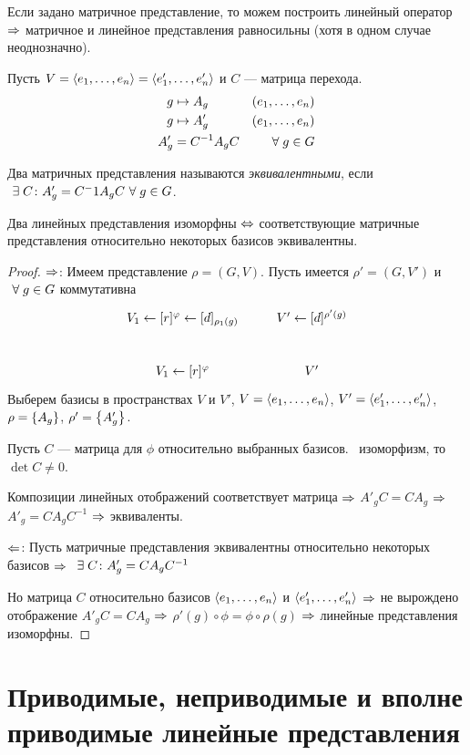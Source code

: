 Если задано матричное представление,
то можем построить линейный оператор $\Rightarrow$
матричное и линейное представления равносильны
(хотя в одном случае неоднозначно).

Пусть $V = \left\langle e_1 ,\ldots, e_n\right\rangle = \left\langle e'_1 ,\ldots, e'_n\right\rangle$ и $C$ --- матрица перехода.
\begin{align*}
	g &\mapsto A_g & \left(e_1 ,\ldots, e_n\right) \\
	g &\mapsto A'_g & \left(e_1 ,\ldots, e_n\right) \\
	A'_g & = C^{-1} A_g C & ~\forall\; g \in G
\end{align*}

\begin{df}
	Два матричных представления называются \textit{эквивалентными},
	если 
		$~\exists\; C \colon A'_g = C^-1 A_g C ~\forall\; g \in G$.
\end{df}

\begin{stm}
	Два линейных представления изоморфны $\Leftrightarrow$
	соответствующие матричные представления относительно некоторых базисов эквивалентны.
\end{stm}
\begin{proof}
	$\Rightarrow$: Имеем представление $\rho = (G, V)$.
	Пусть имеется $\rho' = (G, V')$ и $~\forall\; g \in G$ коммутативна
	$$
		\xymatrix{
				V_1 \ar[r]^{\phi} \ar[d]_{\rho_1(g)} & V' \ar[d]^{\rho'(g)} \\
				V_1 \ar[r]^{\phi} & V'
			}
	$$
	Выберем базисы в пространствах $V$ и $V'$,
	$V = \left\langle e_1 ,\ldots, e_n\right\rangle$, $V' = \left\langle e'_1 ,\ldots, e'_n\right\rangle$, $\rho = \left\{A_g\right\}$, $\rho' = \left\{A'_g\right\}$.

	Пусть $C$ --- матрица для $\phi$ относительно выбранных базисов.
	\Bt\ изоморфизм, то $\det C \ne 0$.

	Композиции линейных отображений соответствует матрица $\Rightarrow$
	$A'_g C = C A_g$ $\Rightarrow$ $A'_g = C A_g C^{-1}$ $\Rightarrow$ эквиваленты.

	$\Leftarrow$: Пусть матричные представления эквивалентны относительно некоторых базисов $\Rightarrow$
	$~\exists\; C \colon A'_g = C A_g C^{-1}$

	Но матрица $C$ относительно базисов $\left\langle e_1 ,\ldots, e_n\right\rangle$ и $\left\langle e'_1 ,\ldots, e'_n\right\rangle$ $\Rightarrow$
	не вырождено отображение $A'_g C = C A_g$ $\Rightarrow$ $\rho'(g) \circ \phi = \phi \circ \rho(g)$ $\Rightarrow$
	линейные представления изоморфны.
\end{proof}


\section{Приводимые, неприводимые и вполне приводимые линейные представления}

